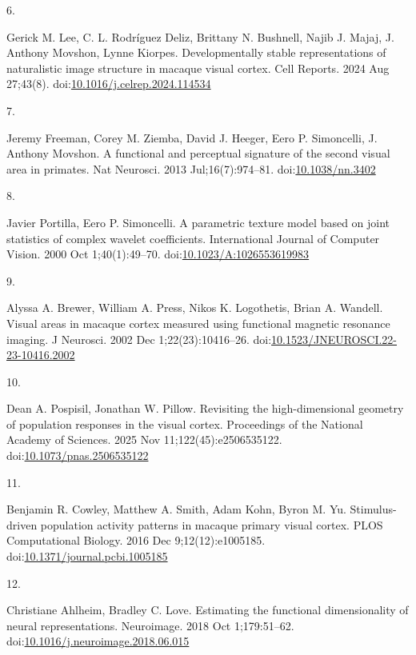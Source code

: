 \documentclass[
  11pt,
  letterpaper,
  DIV=11,
  numbers=noendperiod]{scrartcl}
\newlength{\cslhangindent}
\newlength{\csllabelwidth}
\newenvironment{CSLReferences}[2] %
 {\begin{list}{}{%
  \setlength{\itemindent}{0pt}
  \setlength{\leftmargin}{0pt}
  \setlength{\parsep}{0pt}
  \ifodd #1
   \setlength{\leftmargin}{\cslhangindent}
   \setlength{\itemindent}{-1\cslhangindent}
  \fi
  \setlength{\itemsep}{#2\baselineskip}}}
 {\end{list}}
\newcommand{\CSLLeftMargin}[1]{\parbox[t]{\csllabelwidth}{\strut#1\strut}}
\newcommand{\CSLRightInline}[1]{\parbox[t]{\linewidth - \csllabelwidth}{\strut#1\strut}}
\begin{document}
\begin{CSLReferences}{0}{1}
\CSLLeftMargin{6. }%
\CSLRightInline{Gerick M. Lee, C. L. Rodríguez Deliz, Brittany N.
Bushnell, Najib J. Majaj, J. Anthony Movshon, Lynne Kiorpes.
Developmentally stable representations of naturalistic image structure
in macaque visual cortex. Cell Reports. 2024 Aug 27;43(8).
doi:\href{https://doi.org/10.1016/j.celrep.2024.114534}{10.1016/j.celrep.2024.114534}}

\CSLLeftMargin{7. }%
\CSLRightInline{Jeremy Freeman, Corey M. Ziemba, David J. Heeger, Eero
P. Simoncelli, J. Anthony Movshon. A functional and perceptual signature
of the second visual area in primates. Nat Neurosci. 2013
Jul;16(7):974--81.
doi:\href{https://doi.org/10.1038/nn.3402}{10.1038/nn.3402}}

\CSLLeftMargin{8. }%
\CSLRightInline{Javier Portilla, Eero P. Simoncelli. A parametric
texture model based on joint statistics of complex wavelet coefficients.
International Journal of Computer Vision. 2000 Oct 1;40(1):49--70.
doi:\href{https://doi.org/10.1023/A:1026553619983}{10.1023/A:1026553619983}}

\CSLLeftMargin{9. }%
\CSLRightInline{Alyssa A. Brewer, William A. Press, Nikos K. Logothetis,
Brian A. Wandell. Visual areas in macaque cortex measured using
functional magnetic resonance imaging. J Neurosci. 2002 Dec
1;22(23):10416--26.
doi:\href{https://doi.org/10.1523/JNEUROSCI.22-23-10416.2002}{10.1523/JNEUROSCI.22-23-10416.2002}}

\CSLLeftMargin{10. }%
\CSLRightInline{Dean A. Pospisil, Jonathan W. Pillow. Revisiting the
high-dimensional geometry of population responses in the visual cortex.
Proceedings of the National Academy of Sciences. 2025 Nov
11;122(45):e2506535122.
doi:\href{https://doi.org/10.1073/pnas.2506535122}{10.1073/pnas.2506535122}}

\CSLLeftMargin{11. }%
\CSLRightInline{Benjamin R. Cowley, Matthew A. Smith, Adam Kohn, Byron
M. Yu. Stimulus-driven population activity patterns in macaque primary
visual cortex. {PLOS} Computational Biology. 2016 Dec 9;12(12):e1005185.
doi:\href{https://doi.org/10.1371/journal.pcbi.1005185}{10.1371/journal.pcbi.1005185}}

\CSLLeftMargin{12. }%
\CSLRightInline{Christiane Ahlheim, Bradley C. Love. Estimating the
functional dimensionality of neural representations. Neuroimage. 2018
Oct 1;179:51--62.
doi:\href{https://doi.org/10.1016/j.neuroimage.2018.06.015}{10.1016/j.neuroimage.2018.06.015}}

\end{CSLReferences}
\end{document}
